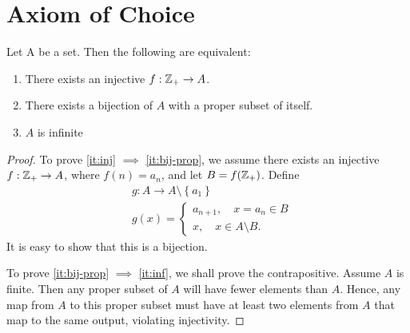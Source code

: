 \section{Axiom of Choice}
\begin{theorem}
	Let A be a set. Then the following are equivalent:
	\begin{enumerate}
		\item\label{it:inj} There exists an injective $f: \mathbb{Z}_{+} \to A$.
		\item\label{it:bij-prop} There exists a bijection of $A$ with a proper subset of itself.
		\item\label{it:inf} $A$ is infinite
	\end{enumerate}
	\label{thm:inj-mapping}
\end{theorem}
\begin{proof}
	To prove \cref{it:inj} $\implies$ \cref{it:bij-prop}, we assume there exists an injective $f: \mathbb{Z}_{+} \to A$, where $f(n) =
	a_{n}$, and let $B = f(\mathbb{Z}_{+})$. Define
	\begin{equation*}
		\begin{split}
			& g: A \to A \setminus \left\{ a_{1} \right\} \\
			& g(x) = \begin{cases}
				a_{n+1}, \quad x = a_{n} \in B \\
				x, \quad x \in A \setminus B.
			\end{cases}
		\end{split}
	\end{equation*} It is easy to show that this is a bijection.

	To prove \cref{it:bij-prop} $\implies$ \cref{it:inf}, we shall prove the
	contrapositive. Assume $A$ is finite. Then any proper subset of $A$ will have
	fewer elements than $A$. Hence, any map from $A$ to this proper subset must
	have at least two elements from $A$ that map to the same output, violating
	injectivity.


\end{proof}

